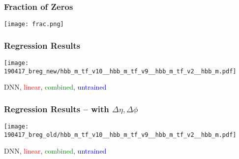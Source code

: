 \documentclass{beamer}
\newcommand{\beginbackup}{
  \newcounter{framenumbervorappendix}
  \setcounter{framenumbervorappendix}{\value{framenumber}}
}
\newcommand{\backupend}{
  \addtocounter{framenumbervorappendix}{-\value{framenumber}}
  \addtocounter{framenumber}{\value{framenumbervorappendix}}
}
\begin{document}
\begin{frame}
  \frametitle{Fraction of Zeros}
  \centering
  \texttt{[image: frac.png]}
\end{frame}

\begin{frame}
  \frametitle{Regression Results}
  \centering
  \texttt{[image: 190417\_breg\_new/hbb\_m\_tf\_v10\_\_hbb\_m\_tf\_v9\_\_hbb\_m\_tf\_v2\_\_hbb\_m.pdf]}

  DNN, \textcolor{red}{linear}, \textcolor{green}{combined}, \textcolor{blue}{untrained}

\end{frame}

\begin{frame}
  \frametitle{Regression Results -- with $\Delta \eta, \Delta \phi$}
  \centering
  \texttt{[image: 190417\_breg\_old/hbb\_m\_tf\_v10\_\_hbb\_m\_tf\_v9\_\_hbb\_m\_tf\_v2\_\_hbb\_m.pdf]}

  DNN, \textcolor{red}{linear}, \textcolor{green}{combined}, \textcolor{blue}{untrained}

\end{frame}

\begin{comment}
\beginbackup

\begin{frame}
  \frametitle{Backup Slides}
\end{frame}



\backupend
\end{comment}
\end{document}
